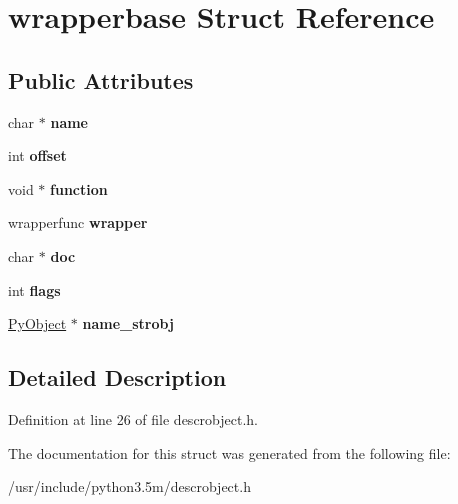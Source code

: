 \hypertarget{structwrapperbase}{}\section{wrapperbase Struct Reference}
\label{structwrapperbase}
\subsection*{Public Attributes}
\begin{DoxyCompactItemize}
\item 
char $\ast$ {\bfseries name}\hypertarget{structwrapperbase_a06495b071572d166c15f6b4a8df707e6}{}\label{structwrapperbase_a06495b071572d166c15f6b4a8df707e6}

\item 
int {\bfseries offset}\hypertarget{structwrapperbase_aee6e2c07d565ab34389ac8d45d952ea2}{}\label{structwrapperbase_aee6e2c07d565ab34389ac8d45d952ea2}

\item 
void $\ast$ {\bfseries function}\hypertarget{structwrapperbase_aab5178ddcd1f1fc7daca3c9df727d773}{}\label{structwrapperbase_aab5178ddcd1f1fc7daca3c9df727d773}

\item 
wrapperfunc {\bfseries wrapper}\hypertarget{structwrapperbase_aaec58b56ee4db0e3c2dba8efa92c942f}{}\label{structwrapperbase_aaec58b56ee4db0e3c2dba8efa92c942f}

\item 
char $\ast$ {\bfseries doc}\hypertarget{structwrapperbase_a827bda21121a05de0996818cd83c5767}{}\label{structwrapperbase_a827bda21121a05de0996818cd83c5767}

\item 
int {\bfseries flags}\hypertarget{structwrapperbase_ab7f68db17d76c48f276b35dce235a8a5}{}\label{structwrapperbase_ab7f68db17d76c48f276b35dce235a8a5}

\item 
\hyperlink{struct__object}{Py\+Object} $\ast$ {\bfseries name\+\_\+strobj}\hypertarget{structwrapperbase_abd81cf31bd8789a91df833b702204433}{}\label{structwrapperbase_abd81cf31bd8789a91df833b702204433}

\end{DoxyCompactItemize}


\subsection{Detailed Description}


Definition at line 26 of file descrobject.\+h.



The documentation for this struct was generated from the following file\+:\begin{DoxyCompactItemize}
\item 
/usr/include/python3.\+5m/descrobject.\+h\end{DoxyCompactItemize}
